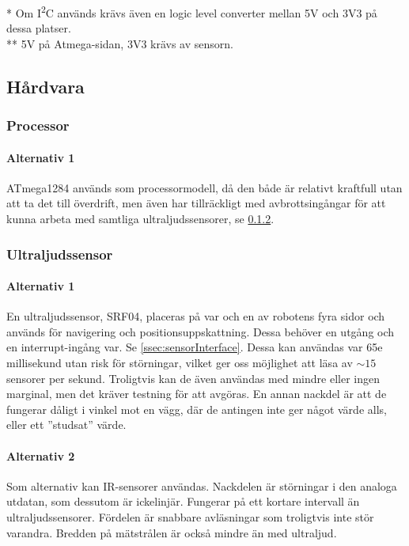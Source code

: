 \documentclass[a4paper,11pt]{article}
\begin{document}
\noindent \begin{small}
    * Om I\textsuperscript{2}C används krävs även en logic level converter mellan 5V och 3V3 på dessa platser.\\
    ** 5V på Atmega-sidan, 3V3 krävs av sensorn.
\end{small}
\subsection{Hårdvara}

\subsubsection{Processor} %

\paragraph{Alternativ 1} %
ATmega1284 används som processormodell, då den både är relativt kraftfull utan att ta det till överdrift, men även har tillräckligt med avbrottsingångar för att kunna arbeta med samtliga ultraljudssensorer, se \ref{sssec:sonicsensors}.

\subsubsection{Ultraljudssensor} \label{sssec:sonicsensors}
\paragraph{Alternativ 1}
En ultraljudssensor, SRF04, placeras på var och en av robotens fyra sidor och används för navigering och positionsuppskattning. Dessa behöver en utgång och en interrupt-ingång var. Se \ref{ssec:sensorInterface}. Dessa kan användas var 65e millisekund utan risk för störningar, vilket ger oss möjlighet att läsa av $\sim15$ sensorer per sekund. Troligtvis kan de även användas med mindre eller ingen marginal, men det kräver testning för att avgöras. En annan nackdel är att de fungerar dåligt i vinkel mot en vägg, där de antingen inte ger något värde alls, eller ett ''studsat'' värde. %

\paragraph{Alternativ 2}
Som alternativ kan IR-sensorer användas. Nackdelen är störningar i den analoga utdatan, som dessutom är ickelinjär. Fungerar på ett kortare intervall än ultraljudssensorer. Fördelen är snabbare avläsningar som troligtvis inte stör varandra. Bredden på mätstrålen är också mindre än med ultraljud.
\end{document}
